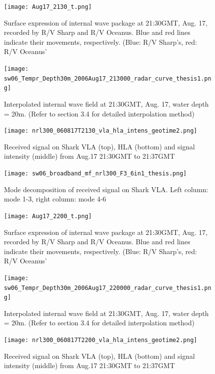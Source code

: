 \begin{figure}[h]
  \centering
  \texttt{[image: Aug17\_2130\_t.png]}
  \caption{Surface expression of internal wave package at 21:30GMT, Aug. 17, recorded by R/V Sharp and R/V Oceanus. Blue and red lines indicate their movements, respectively. (Blue: R/V Sharp's, red: R/V Oceanus'}\label{fig:r2130_r}
\end{figure}

\begin{figure}[h]
  \centering
  \texttt{[image: sw06\_Tempr\_Depth30m\_2006Aug17\_213000\_radar\_curve\_thesis1.png]}
  \caption{Interpolated internal wave field at 21:30GMT, Aug. 17, water depth = 20m. (Refer to section 3.4 for detailed interpolation method)}\label{fig:r2130_i}
\end{figure}

\begin{figure}[h]
  \centering
  \texttt{[image: nrl300\_060817T2130\_vla\_hla\_intens\_geotime2.png]}
  \caption{Received signal on Shark VLA (top), HLA (bottom) and signal intensity (middle) from Aug.17 21:30GMT to 21:37GMT }\label{fig:a2130}
\end{figure}

\begin{figure}[h]
  \centering
  \texttt{[image: sw06\_broadband\_mf\_nrl300\_F3\_6in1\_thesis.png]}
  \caption{Mode decomposition of received signal on Shark VLA. 
    Left column: mode 1-3, right column: mode 4-6 }\label{fig:m2130}
\end{figure}


\begin{figure}[h]
  \centering
  \texttt{[image: Aug17\_2200\_t.png]}
  \caption{Surface expression of internal wave package at 21:30GMT, Aug. 17, recorded by R/V Sharp and R/V Oceanus. Blue and red lines indicate their movements, respectively. (Blue: R/V Sharp's, red: R/V Oceanus'}\label{fig:r2130_r}
\end{figure}

\begin{figure}[h]
  \centering
  \texttt{[image: sw06\_Tempr\_Depth30m\_2006Aug17\_220000\_radar\_curve\_thesis1.png]}
  \caption{Interpolated internal wave field at 21:30GMT, Aug. 17, water depth = 20m. (Refer to section 3.4 for detailed interpolation method)}\label{fig:r2130_i}
\end{figure}

\begin{figure}[h]
  \centering
  \texttt{[image: nrl300\_060817T2200\_vla\_hla\_intens\_geotime2.png]}
  \caption{Received signal on Shark VLA (top), HLA (bottom) and signal intensity (middle) from Aug.17 21:30GMT to 21:37GMT }\label{fig:a2130}
\end{figure}

